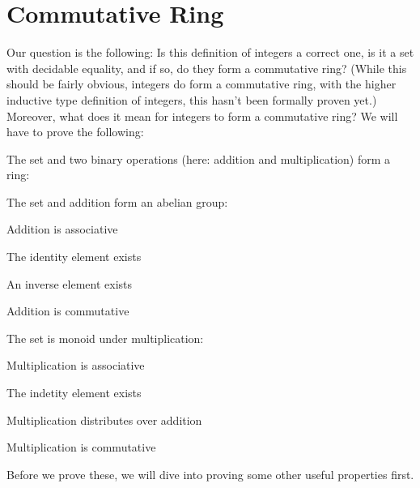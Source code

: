\section{Commutative Ring}

Our question is the following: Is this definition of integers a correct one, is it a set with decidable equality, and if so, do they form a commutative ring? (While this should be fairly obvious, integers do form a commutative ring, with the higher inductive type definition of integers, this hasn't been formally proven yet.) Moreover, what does it mean for integers to form a commutative ring? We will have to prove the following:

\begin{compactitem}
  \item The set and two binary operations (here: addition and multiplication) form a ring:
  \begin{compactitem}
    \item The set and addition form an abelian group:
    \begin{compactitem}
    \item Addition is associative
    \item The identity element exists
    \item An inverse element exists
    \item Addition is commutative
    \end{compactitem}
  \item The set is monoid under multiplication:
    \begin{compactitem}
    \item Multiplication is associative
    \item The indetity element exists
    \end{compactitem}
  \item Multiplication distributes over addition
  \end{compactitem}
  \item Multiplication is commutative
\end{compactitem}
Before we prove these, we will dive into proving some other useful properties first.
